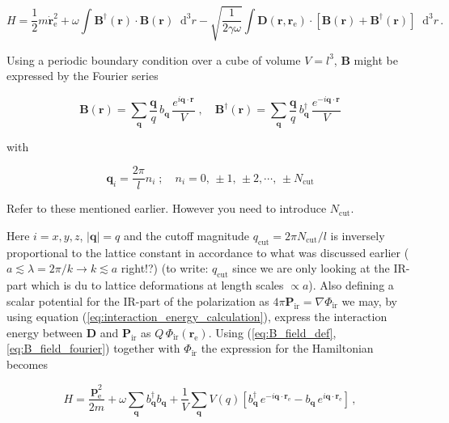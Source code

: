 \documentclass[12pt]{report}
\renewcommand{\vec}[1]{\boldsymbol{\mathbf{#1}}}                        %
\newcommand*\diff{\mathop{}\!\mathrm{d}}
\newcommand{\motivation}[1]{{\leavevmode\color{motivation}#1}}
\newcommand{\todo}[1]{{\leavevmode\color{todo}#1}}
\begin{document}
\begin{equation}
	H = \frac{1}{2} m \dot{\vec r}_\text{e}^2
	+ \omega \int \vec B^\dagger (\vec r) \cdot \vec B (\vec r) \diff^3 r
	- \sqrt{\frac{1}{2 \gamma \omega}} \int \vec D(\vec r, \vec r_\text{e}) \cdot \left[ \vec B(\vec r) +  \vec B^\dagger(\vec r) \right] \diff^3 r \,.
\end{equation}

Using a periodic boundary condition over a cube of volume $ V = l^3 $, $ \vec B $ might be expressed by the Fourier series

\begin{equation}
	\label{eq:B_field_fourier}
	\vec B (\vec r) = \sum_{\vec q} \frac{\vec q}{q} \, b_{\vec q} \, \frac{e^{i \vec q \cdot \vec r}}{V}
	\; , \quad
	\vec B^\dagger (\vec r) = \sum_{\vec q} \frac{\vec q}{q} \, b^\dagger_{\vec q} \, \frac{e^{-i \vec q \cdot \vec r}}{V}
\end{equation}

with

\begin{equation}
	\vec q_i = \frac{2\pi}{l} n_i
	\; ; \quad 
	n_i = 0, \, \pm 1, \, \pm 2, \cdots , \, \pm N_\text{cut}
\end{equation}

\todo{Refer to these mentioned earlier. However you need to introduce $ N_\text{cut} $.}

Here  $ i = x, y, z $, $ | \vec q | = q $ and the cutoff magnitude $ q_\text{cut} = 2 \pi N_\text{cut} / l $ is inversely proportional to the lattice constant in accordance to what was discussed earlier \motivation{($ a \lesssim \lambda = 2 \pi / k \rightarrow k \lesssim a $ right!?)} \todo{(to write: $ q_\text{cut} $ since we are only looking at the IR-part which is du to lattice deformations at length scales $ \propto  a $)}. Also defining a scalar potential for the IR-part of the polarization as $ 4 \pi \vec P_\text{ir} = \nabla \Phi_\text{ir} $ we may, by using equation (\ref{eq:interaction_energy_calculation}), express the interaction energy between $ \vec D $ and $ \vec P_\text{ir} $ as $ Q \, \Phi_\text{ir} (\vec r_\text{e}) $. Using (\ref{eq:B_field_def}, \ref{eq:B_field_fourier}) together with $ \Phi_\text{ir} $ the expression for the Hamiltonian becomes

\begin{equation}
	H = \frac{\vec p_\text{e}^2}{2m}
	+ \omega \sum_{\vec q} b^\dagger_{\vec q} b_{\vec q}
	+ \frac{1}{V} \sum_{\vec q} V(q) \left[ b^\dagger_{\vec q} \, e^{-i \vec q \cdot \vec r_\text{e}} - b_{\vec q} \, e^{i \vec q \cdot \vec r_\text{e}} \right] \,,
\end{equation}
\end{document}
